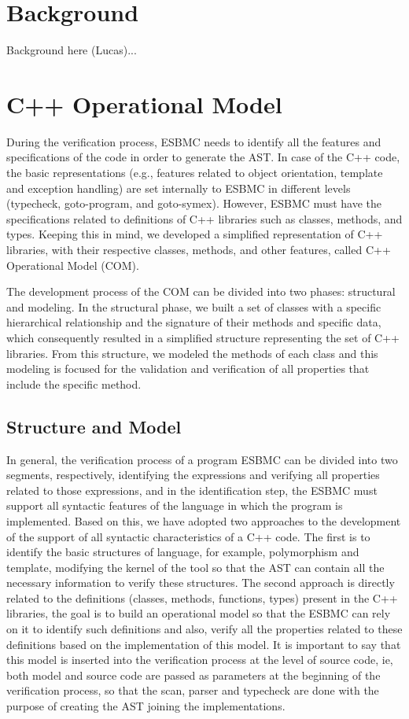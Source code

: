 \documentclass[a4paper]{llncs}
\begin{document}
\section{Background}
%
Background here (Lucas)...

\section{C++ Operational Model}
%
During the verification process, ESBMC needs to identify all the features and specifications of the code in order to generate the AST. In case of the C++ code, the basic representations (e.g., features related to object orientation, template and exception handling) are set internally to ESBMC in different levels (typecheck, goto-program, and goto-symex). However, ESBMC must have the specifications related to definitions of C++ libraries such as classes, methods, and types. Keeping this in mind, we developed a simplified representation of C++ libraries, with their respective classes, methods, and other features, called C++ Operational Model (COM).


The development process of the COM can be divided into two phases: structural and modeling. In the structural phase, we built a set of classes with a specific hierarchical relationship and the signature of their methods and specific data, which consequently resulted in a simplified structure representing the set of C++ libraries. From this structure, we modeled the methods of each class and this modeling is focused for the validation and verification of all properties that include the specific method.
%
\subsection{Structure and Model}
%
In general, the verification process of a program ESBMC can be divided into two segments, respectively, identifying the expressions and verifying all properties related to those expressions, and in the identification step, the ESBMC must support all syntactic features of the language in which the program is implemented. Based on this, we have adopted two approaches to the development of the support of all syntactic characteristics of a C++ code. The first is to identify the basic structures of language, for example, polymorphism and template, modifying the kernel of the tool so that the AST can contain all the necessary information to verify these structures. The second approach is directly related to the definitions (classes, methods, functions, types) present in the C++ libraries, the goal is to build an operational model so that the ESBMC can rely on it to identify such definitions and also, verify all the properties related to these definitions based on the implementation of this model. It is important to say that this model is inserted into the verification process at the level of source code, ie, both model and source code are passed as parameters at the beginning of the verification process, so that the scan, parser and typecheck are done with the purpose of creating the AST joining the implementations.
\end{document}
